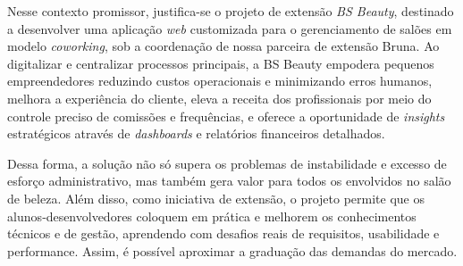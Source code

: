 \FloatBarrier

Nesse contexto promissor, justifica-se o projeto de extensão \emph{BS Beauty}, destinado a desenvolver uma aplicação \emph{web} customizada para o gerenciamento de salões em modelo \emph{coworking}, sob a coordenação de nossa parceira de extensão Bruna. Ao digitalizar e centralizar processos principais, a BS Beauty empodera pequenos empreendedores reduzindo custos operacionais e minimizando erros humanos, melhora a experiência do cliente, eleva a receita dos profissionais por meio do controle preciso de comissões e frequências, e oferece a oportunidade de \emph{insights} estratégicos através de \emph{dashboards} e relatórios financeiros detalhados. 

Dessa forma, a solução não só supera os problemas de instabilidade e excesso de esforço administrativo, mas também gera valor para todos os envolvidos no salão de beleza. Além disso, como iniciativa de extensão, o projeto permite que os alunos‐desenvolvedores coloquem em prática e melhorem os conhecimentos técnicos e de gestão,  aprendendo com desafios reais de requisitos, usabilidade e performance. Assim, é possível aproximar a graduação das demandas do mercado.


